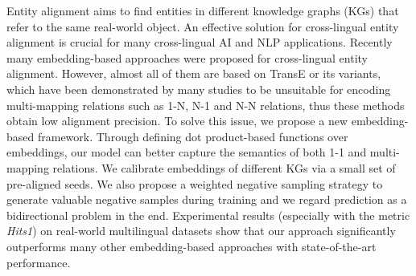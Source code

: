 Entity alignment aims to find entities in different knowledge graphs (KGs) that refer to the same real-world object. An effective solution for cross-lingual entity alignment is crucial for
many cross-lingual AI and NLP applications. Recently many embedding-based approaches were proposed for cross-lingual entity alignment.  However, almost all of them are based on TransE or its variants, which have been demonstrated by many studies to be unsuitable for encoding multi-mapping relations such as 1-N, N-1 and N-N relations, thus these methods obtain low alignment precision. To solve this issue, we propose a new embedding-based framework. Through defining dot product-based functions over embeddings, our model can better capture the semantics of both 1-1 and multi-mapping relations. We calibrate embeddings of different KGs via a small set of pre-aligned seeds. We also propose a weighted negative sampling strategy to generate valuable negative samples during training and we regard prediction as a bidirectional problem in the end. Experimental results (especially with the metric \emph{Hits\@1}) on real-world multilingual datasets show that our approach significantly outperforms many other embedding-based approaches with state-of-the-art performance.
